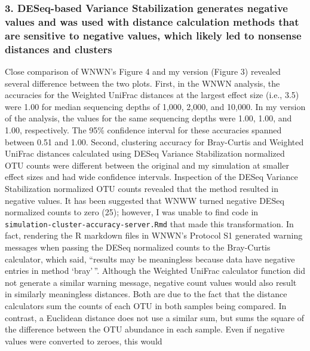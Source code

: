 \documentclass[
]{article}
\begin{document}
\hypertarget{deseq-based-variance-stabilization-generates-negative-values-and-was-used-with-distance-calculation-methods-that-are-sensitive-to-negative-values-which-likely-led-to-nonsense-distances-and-clusters}{%
\subsubsection{3. DESeq-based Variance Stabilization generates negative
values and was used with distance calculation methods that are sensitive
to negative values, which likely led to nonsense distances and
clusters}\label{deseq-based-variance-stabilization-generates-negative-values-and-was-used-with-distance-calculation-methods-that-are-sensitive-to-negative-values-which-likely-led-to-nonsense-distances-and-clusters}}

Close comparison of WNWN's Figure 4 and my version (Figure 3) revealed
several difference between the two plots. First, in the WNWN analysis,
the accuracies for the Weighted UniFrac distances at the largest effect
size (i.e., 3.5) were 1.00 for median sequencing depths of 1,000, 2,000,
and 10,000. In my version of the analysis, the values for the same
sequencing depths were 1.00, 1.00, and 1.00, respectively. The 95\%
confidence interval for these accuracies spanned between 0.51 and 1.00.
Second, clustering accuracy for Bray-Curtis and Weighted UniFrac
distances calculated using DESeq Variance Stabilization normalized OTU
counts were different between the original and my simulation at smaller
effect sizes and had wide confidence intervals. Inspection of the DESeq
Variance Stabilization normalized OTU counts revealed that the method
resulted in negative values. It has been suggested that WNWW turned
negative DESeq normalized counts to zero (25); however, I was unable to
find code in \texttt{simulation-cluster-accuracy-server.Rmd} that made
this transformation. In fact, rendering the R markdown files in WNWN's
Protocol S1 generated warning messages when passing the DESeq normalized
counts to the Bray-Curtis calculator, which said, ``results may be
meaningless because data have negative entries in method `bray'\,''.
Although the Weighted UniFrac calculator function did not generate a
similar warning message, negative count values would also result in
similarly meaningless distances. Both are due to the fact that the
distance calculators sum the counts of each OTU in both samples being
compared. In contrast, a Euclidean distance does not use a similar sum,
but sums the square of the difference between the OTU abundance in each
sample. Even if negative values were converted to zeroes, this would
\end{document}
